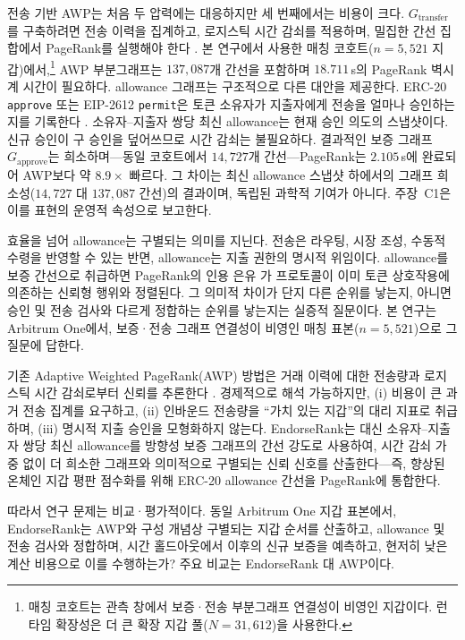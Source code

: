 전송 기반 AWP는 처음 두 압력에는 대응하지만 세 번째에서는 비용이 크다. $G_{\text{transfer}}$를 구축하려면 전송 이력을 집계하고, 로지스틱 시간 감쇠를 적용하며, 밀집한 간선 집합에서 PageRank를 실행해야 한다 . 본 연구에서 사용한 매칭 코호트($n=5{,}521$ 지갑)에서,\footnote{매칭 코호트는 관측 창에서 보증·전송 부분그래프 연결성이 비영인 지갑이다. 런타임 확장성은 더 큰 확장 지갑 풀($N=31{,}612$)을 사용한다.} AWP 부분그래프는 $137{,}087$개 간선을 포함하며 $18.711$\,s의 PageRank 벽시계 시간이 필요하다. allowance 그래프는 구조적으로 다른 대안을 제공한다. ERC-20 \texttt{approve} 또는 EIP-2612 \texttt{permit}은 토큰 소유자가 지출자에게 전송을 얼마나 승인하는지를 기록한다 . 소유자--지출자 쌍당 최신 allowance는 현재 승인 의도의 스냅샷이다. 신규 승인이 구 승인을 덮어쓰므로 시간 감쇠는 불필요하다. 결과적인 보증 그래프 $G_{\text{approve}}$는 희소하며---동일 코호트에서 $14{,}727$개 간선---PageRank는 $2.105$\,s에 완료되어 AWP보다 약 $8.9\times$ 빠르다. 그 차이는 최신 allowance 스냅샷 하에서의 그래프 희소성($14{,}727$ 대 $137{,}087$ 간선)의 결과이며, 독립된 과학적 기여가 아니다. 주장~C1은 이를 표현의 운영적 속성으로 보고한다.

효율을 넘어 allowance는 구별되는 의미를 지닌다. 전송은 라우팅, 시장 조성, 수동적 수령을 반영할 수 있는 반면, allowance는 지출 권한의 명시적 위임이다. allowance를 보증 간선으로 취급하면 PageRank의 인용 은유 가 프로토콜이 이미 토큰 상호작용에 의존하는 신뢰형 행위와 정렬된다. 그 의미적 차이가 단지 다른 순위를 낳는지, 아니면 승인 및 전송 검사와 다르게 정합하는 순위를 낳는지는 실증적 질문이다. 본 연구는 Arbitrum One에서, 보증·전송 그래프 연결성이 비영인 매칭 표본($n=5{,}521$)으로 그 질문에 답한다.


기존 Adaptive Weighted PageRank(AWP) 방법은 거래 이력에 대한 전송량과 로지스틱 시간 감쇠로부터 신뢰를 추론한다 . 경제적으로 해석 가능하지만, (i) 비용이 큰 과거 전송 집계를 요구하고, (ii) 인바운드 전송량을 ``가치 있는 지갑''의 대리 지표로 취급하며, (iii) 명시적 지출 승인을 모형화하지 않는다. EndorseRank는 대신 소유자--지출자 쌍당 최신 allowance를 방향성 보증 그래프의 간선 강도로 사용하여, 시간 감쇠 가중 없이 더 희소한 그래프와 의미적으로 구별되는 신뢰 신호를 산출한다---즉, 향상된 온체인 지갑 평판 점수화를 위해 ERC-20 allowance 간선을 PageRank에 통합한다.

따라서 연구 문제는 비교·평가적이다. 동일 Arbitrum One 지갑 표본에서, EndorseRank는 AWP와 구성 개념상 구별되는 지갑 순서를 산출하고, allowance 및 전송 검사와 정합하며, 시간 홀드아웃에서 이후의 신규 보증을 예측하고, 현저히 낮은 계산 비용으로 이를 수행하는가? 주요 비교는 EndorseRank 대 AWP이다.

